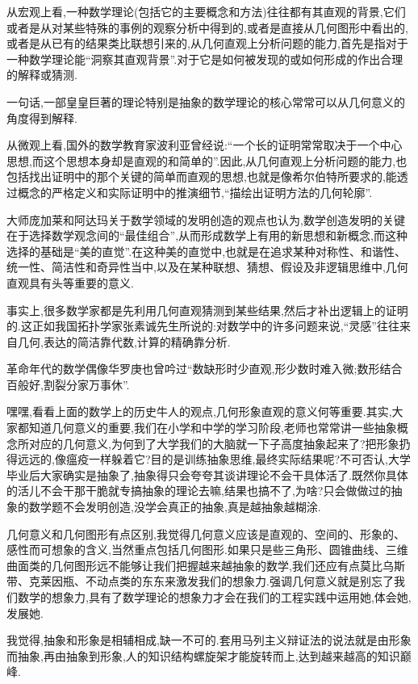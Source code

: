\documentclass[12pt]{article}
\renewcommand{\,}{\ \text{,}}
\renewcommand{\.}{\ \text{.}}
\begin{document}
从宏观上看,一种数学理论(包括它的主要概念和方法)往往都有其直观的背景,它们或者是从对某些特殊的事例的观察分析中得到的,或者是直接从几何图形中看出的,或者是从已有的结果类比联想引来的,从几何直观上分析问题的能力,首先是指对于一种数学理论能``洞察其直观背景''.对于它是如何被发现的或如何形成的作出合理的解释或猜测.

一句话,一部皇皇巨著的理论特别是抽象的数学理论的核心常常可以从几何意义的角度得到解释.

从微观上看,国外的数学教育家波利亚曾经说:``一个长的证明常常取决于一个中心思想,而这个思想本身却是直观的和简单的''.因此,从几何直观上分析问题的能力,也包括找出证明中的那个关键的简单而直观的思想,也就是像希尔伯特所要求的,能透过概念的严格定义和实际证明中的推演细节,``描绘出证明方法的几何轮廓''.

大师庞加莱和阿达玛关于数学领域的发明创造的观点也认为,数学创造发明的关键在于选择数学观念间的``最佳组合'',从而形成数学上有用的新思想和新概念,而这种选择的基础是``美的直觉''.在这种美的直觉中,也就是在追求某种对称性、和谐性、统一性、简洁性和奇异性当中,以及在某种联想、猜想、假设及非逻辑思维中,几何直观具有头等重要的意义.

事实上,很多数学家都是先利用几何直观猜测到某些结果,然后才补出逻辑上的证明的.这正如我国拓扑学家张素诚先生所说的:对数学中的许多问题来说,``灵感''往往来自几何,表达的简洁靠代数,计算的精确靠分析.

革命年代的数学偶像华罗庚也曾吟过``数缺形时少直观,形少数时难入微;数形结合百般好,割裂分家万事休''.

嘿嘿,看看上面的数学上的历史牛人的观点,几何形象直观的意义何等重要.其实,大家都知道几何意义的重要,我们在小学和中学的学习阶段,老师也常常讲一些抽象概念所对应的几何意义,为何到了大学我们的大脑就一下子高度抽象起来了?把形象扔得远远的,像瘟疫一样躲着它?目的是训练抽象思维,最终实际结果呢?不可否认,大学毕业后大家确实是抽象了,抽象得只会夸夸其谈讲理论不会干具体活了.既然你具体的活儿不会干那干脆就专搞抽象的理论去嘛,结果也搞不了,为啥?只会做做过的抽象的数学题不会发明创造,没学会真正的抽象,真是越抽象越糊涂.

几何意义和几何图形有点区别,我觉得几何意义应该是直观的、空间的、形象的、感性而可想象的含义,当然重点包括几何图形.如果只是些三角形、圆锥曲线、三维曲面类的几何图形远不能够让我们把握越来越抽象的数学,我们还应有点莫比乌斯带、克莱因瓶、不动点类的东东来激发我们的想象力.强调几何意义就是别忘了我们数学的想象力,具有了数学理论的想象力才会在我们的工程实践中运用她,体会她,发展她.

我觉得,抽象和形象是相辅相成,缺一不可的.套用马列主义辩证法的说法就是由形象而抽象,再由抽象到形象,人的知识结构螺旋架才能旋转而上,达到越来越高的知识巅峰.
\end{document}
